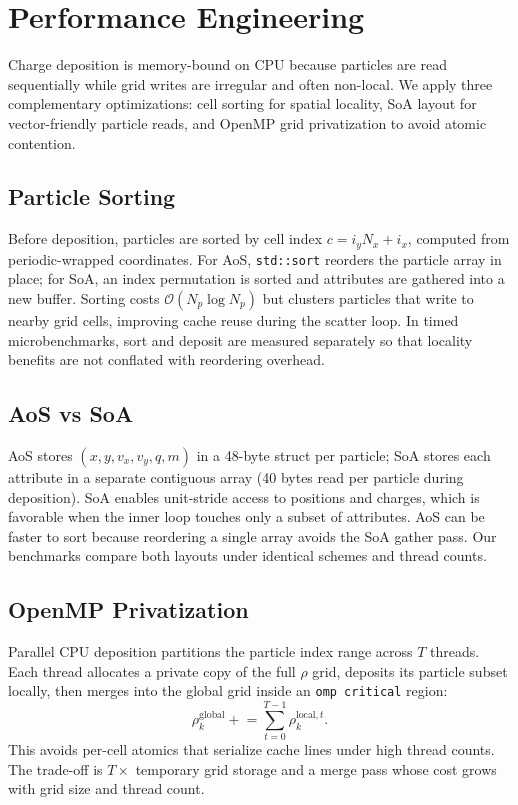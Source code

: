 \section{Performance Engineering}
Charge deposition is memory-bound on CPU because particles are read sequentially while grid writes are irregular and often non-local.
We apply three complementary optimizations: cell sorting for spatial locality, SoA layout for vector-friendly particle reads, and OpenMP grid privatization to avoid atomic contention.

\subsection{Particle Sorting}
Before deposition, particles are sorted by cell index $c = i_y N_x + i_x$, computed from periodic-wrapped coordinates.
For AoS, \texttt{std::sort} reorders the particle array in place; for SoA, an index permutation is sorted and attributes are gathered into a new buffer.
Sorting costs $\mathcal{O}(N_p \log N_p)$ but clusters particles that write to nearby grid cells, improving cache reuse during the scatter loop.
In timed microbenchmarks, sort and deposit are measured separately so that locality benefits are not conflated with reordering overhead.

\subsection{AoS vs SoA}
AoS stores $(x,y,v_x,v_y,q,m)$ in a 48-byte struct per particle; SoA stores each attribute in a separate contiguous array (40 bytes read per particle during deposition).
SoA enables unit-stride access to positions and charges, which is favorable when the inner loop touches only a subset of attributes.
AoS can be faster to sort because reordering a single array avoids the SoA gather pass.
Our benchmarks compare both layouts under identical schemes and thread counts.

\subsection{OpenMP Privatization}
Parallel CPU deposition partitions the particle index range across $T$ threads.
Each thread allocates a private copy of the full $\rho$ grid, deposits its particle subset locally, then merges into the global grid inside an \texttt{omp critical} region:
\begin{equation}
    \rho^{\mathrm{global}}_k \mathrel{+}= \sum_{t=0}^{T-1} \rho^{\mathrm{local},t}_k.
\end{equation}
This avoids per-cell atomics that serialize cache lines under high thread counts.
The trade-off is $T\times$ temporary grid storage and a merge pass whose cost grows with grid size and thread count.

